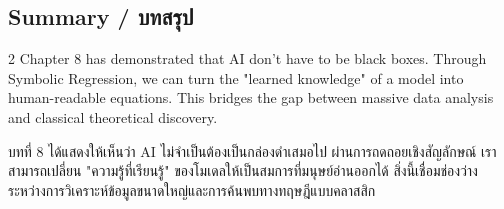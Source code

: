 \subsection{Summary \quad / \quad \textthai{บทสรุป}}
\begin{paracol}{2}
Chapter 8 has demonstrated that AI don't have to be black boxes. Through Symbolic Regression, we can turn the "learned knowledge" of a model into human-readable equations. This bridges the gap between massive data analysis and classical theoretical discovery.

\switchcolumn

\begin{thai}
บทที่ 8 ได้แสดงให้เห็นว่า AI ไม่จำเป็นต้องเป็นกล่องดำเสมอไป ผ่านการถดถอยเชิงสัญลักษณ์ เราสามารถเปลี่ยน "ความรู้ที่เรียนรู้" ของโมเดลให้เป็นสมการที่มนุษย์อ่านออกได้ สิ่งนี้เชื่อมช่องว่างระหว่างการวิเคราะห์ข้อมูลขนาดใหญ่และการค้นพบทางทฤษฎีแบบคลาสสิก
\end{thai}
\end{paracol}
